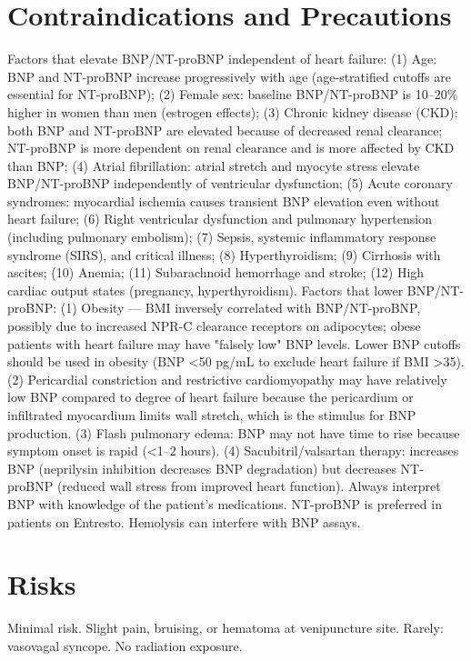 \section*{Contraindications and Precautions}
Factors that elevate BNP/NT-proBNP independent of heart failure: (1) Age: BNP and NT-proBNP increase progressively with age (age-stratified cutoffs are essential for NT-proBNP); (2) Female sex: baseline BNP/NT-proBNP is 10--20\% higher in women than men (estrogen effects); (3) Chronic kidney disease (CKD): both BNP and NT-proBNP are elevated because of decreased renal clearance; NT-proBNP is more dependent on renal clearance and is more affected by CKD than BNP; (4) Atrial fibrillation: atrial stretch and myocyte stress elevate BNP/NT-proBNP independently of ventricular dysfunction; (5) Acute coronary syndromes: myocardial ischemia causes transient BNP elevation even without heart failure; (6) Right ventricular dysfunction and pulmonary hypertension (including pulmonary embolism); (7) Sepsis, systemic inflammatory response syndrome (SIRS), and critical illness; (8) Hyperthyroidism; (9) Cirrhosis with ascites; (10) Anemia; (11) Subarachnoid hemorrhage and stroke; (12) High cardiac output states (pregnancy, hyperthyroidism). Factors that lower BNP/NT-proBNP: (1) Obesity --- BMI inversely correlated with BNP/NT-proBNP, possibly due to increased NPR-C clearance receptors on adipocytes; obese patients with heart failure may have "falsely low" BNP levels. Lower BNP cutoffs should be used in obesity (BNP <50 pg/mL to exclude heart failure if BMI >35). (2) Pericardial constriction and restrictive cardiomyopathy may have relatively low BNP compared to degree of heart failure because the pericardium or infiltrated myocardium limits wall stretch, which is the stimulus for BNP production. (3) Flash pulmonary edema: BNP may not have time to rise because symptom onset is rapid (<1--2 hours). (4) Sacubitril/valsartan therapy: increases BNP (neprilysin inhibition decreases BNP degradation) but decreases NT-proBNP (reduced wall stress from improved heart function). Always interpret BNP with knowledge of the patient's medications. NT-proBNP is preferred in patients on Entresto. Hemolysis can interfere with BNP assays.

\section*{Risks}
Minimal risk. Slight pain, bruising, or hematoma at venipuncture site. Rarely: vasovagal syncope. No radiation exposure.

